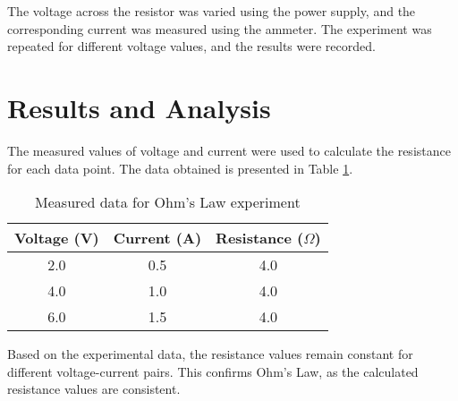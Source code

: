 \documentclass{article}
\begin{document}
The voltage across the resistor was varied using the power supply, and the corresponding current was measured using the ammeter. The experiment was repeated for different voltage values, and the results were recorded.

\section{Results and Analysis}
The measured values of voltage and current were used to calculate the resistance for each data point. The data obtained is presented in Table \ref{tab:data}.

\begin{table}[h]
  \centering
  \caption{Measured data for Ohm's Law experiment}
  \label{tab:data}
  \begin{tabular}{|c|c|c|}
    \hline
    Voltage (V) & Current (A) & Resistance ($\Omega$) \\
    \hline
    2.0 & 0.5 & 4.0 \\
    4.0 & 1.0 & 4.0 \\
    6.0 & 1.5 & 4.0 \\
    \hline
  \end{tabular}
\end{table}

Based on the experimental data, the resistance values remain constant for different voltage-current pairs. This confirms Ohm's Law, as the calculated resistance values are consistent.




\end{document}
